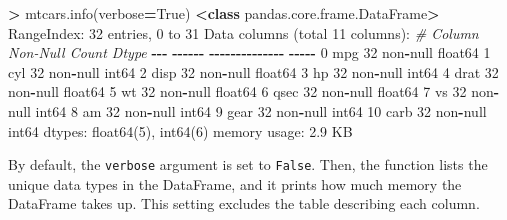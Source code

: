 \documentclass[
]{book}
\newenvironment{Shaded}{\begin{snugshade}}{\end{snugshade}}
\newcommand{\CommentTok}[1]{\textcolor[rgb]{0.56,0.35,0.01}{\textit{#1}}}
\newcommand{\DecValTok}[1]{\textcolor[rgb]{0.00,0.00,0.81}{#1}}
\newcommand{\FloatTok}[1]{\textcolor[rgb]{0.00,0.00,0.81}{#1}}
\newcommand{\KeywordTok}[1]{\textcolor[rgb]{0.13,0.29,0.53}{\textbf{#1}}}
\newcommand{\NormalTok}[1]{#1}
\newcommand{\OperatorTok}[1]{\textcolor[rgb]{0.81,0.36,0.00}{\textbf{#1}}}
\newcommand{\StringTok}[1]{\textcolor[rgb]{0.31,0.60,0.02}{#1}}
\newcommand{\VariableTok}[1]{\textcolor[rgb]{0.00,0.00,0.00}{#1}}
\begin{document}
\begin{Shaded}
\begin{Highlighting}[]
\OperatorTok{\textgreater{}}\NormalTok{ mtcars.info(verbose}\OperatorTok{=}\VariableTok{True}\NormalTok{)}
\OperatorTok{\textless{}}\KeywordTok{class} \StringTok{\textquotesingle{}pandas.core.frame.DataFrame\textquotesingle{}}\OperatorTok{\textgreater{}}
\NormalTok{RangeIndex: }\DecValTok{32}\NormalTok{ entries, }\DecValTok{0}\NormalTok{ to }\DecValTok{31}
\NormalTok{Data columns (total }\DecValTok{11}\NormalTok{ columns):}
 \CommentTok{\#   Column  Non{-}Null Count  Dtype  }
\OperatorTok{{-}{-}{-}}  \OperatorTok{{-}{-}{-}{-}{-}{-}}  \OperatorTok{{-}{-}{-}{-}{-}{-}{-}{-}{-}{-}{-}{-}{-}{-}}  \OperatorTok{{-}{-}{-}{-}{-}}  
 \DecValTok{0}\NormalTok{   mpg     }\DecValTok{32}\NormalTok{ non}\OperatorTok{{-}}\NormalTok{null     float64}
 \DecValTok{1}\NormalTok{   cyl     }\DecValTok{32}\NormalTok{ non}\OperatorTok{{-}}\NormalTok{null     int64  }
 \DecValTok{2}\NormalTok{   disp    }\DecValTok{32}\NormalTok{ non}\OperatorTok{{-}}\NormalTok{null     float64}
 \DecValTok{3}\NormalTok{   hp      }\DecValTok{32}\NormalTok{ non}\OperatorTok{{-}}\NormalTok{null     int64  }
 \DecValTok{4}\NormalTok{   drat    }\DecValTok{32}\NormalTok{ non}\OperatorTok{{-}}\NormalTok{null     float64}
 \DecValTok{5}\NormalTok{   wt      }\DecValTok{32}\NormalTok{ non}\OperatorTok{{-}}\NormalTok{null     float64}
 \DecValTok{6}\NormalTok{   qsec    }\DecValTok{32}\NormalTok{ non}\OperatorTok{{-}}\NormalTok{null     float64}
 \DecValTok{7}\NormalTok{   vs      }\DecValTok{32}\NormalTok{ non}\OperatorTok{{-}}\NormalTok{null     int64  }
 \DecValTok{8}\NormalTok{   am      }\DecValTok{32}\NormalTok{ non}\OperatorTok{{-}}\NormalTok{null     int64  }
 \DecValTok{9}\NormalTok{   gear    }\DecValTok{32}\NormalTok{ non}\OperatorTok{{-}}\NormalTok{null     int64  }
 \DecValTok{10}\NormalTok{  carb    }\DecValTok{32}\NormalTok{ non}\OperatorTok{{-}}\NormalTok{null     int64  }
\NormalTok{dtypes: float64(}\DecValTok{5}\NormalTok{), int64(}\DecValTok{6}\NormalTok{)}
\NormalTok{memory usage: }\FloatTok{2.9}\NormalTok{ KB}
\end{Highlighting}
\end{Shaded}

By default, the \texttt{verbose} argument is set to \texttt{False}. Then, the function lists the unique data types in the DataFrame, and it prints how much memory the DataFrame takes up. This setting excludes the table describing each column.
\end{document}
